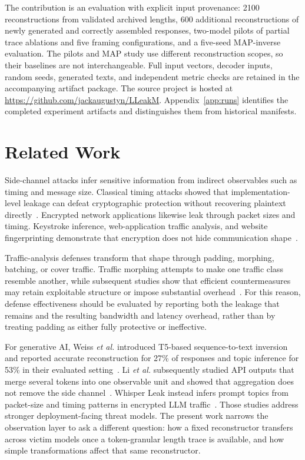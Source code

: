 \documentclass[electronics,article,submit,pdftex,moreauthors]{Definitions/mdpi}
\begin{document}
The contribution is an evaluation with explicit input provenance: 2100 reconstructions from validated archived lengths, 600 additional reconstructions of newly generated and correctly assembled responses, two-model pilots of partial trace ablations and five framing configurations, and a five-seed MAP-inverse evaluation. The pilots and MAP study use different reconstruction scopes, so their baselines are not interchangeable. Full input vectors, decoder inputs, random seeds, generated texts, and independent metric checks are retained in the accompanying artifact package. The source project is hosted at \url{https://github.com/jackaugustyn/LLeakM}. Appendix~\ref{app:runs} identifies the completed experiment artifacts and distinguishes them from historical manifests.

\section{Related Work}
Side-channel attacks infer sensitive information from indirect observables such as timing and message size. Classical timing attacks showed that implementation-level leakage can defeat cryptographic protection without recovering plaintext directly~\cite{kocher1996timing}. Encrypted network applications likewise leak through packet sizes and timing. Keystroke inference, web-application traffic analysis, and website fingerprinting demonstrate that encryption does not hide communication shape~\cite{song2001timing,chen2010sidechannel,cai2012touching,sirinam2018deep}.

Traffic-analysis defenses transform that shape through padding, morphing, batching, or cover traffic. Traffic morphing attempts to make one traffic class resemble another, while subsequent studies show that efficient countermeasures may retain exploitable structure or impose substantial overhead~\cite{wright2009morphing,dyer2012peekaboo}. For this reason, defense effectiveness should be evaluated by reporting both the leakage that remains and the resulting bandwidth and latency overhead, rather than by treating padding as either fully protective or ineffective.

For generative AI, Weiss \emph{et al.} introduced T5-based sequence-to-text inversion and reported accurate reconstruction for 27\% of responses and topic inference for 53\% in their evaluated setting~\cite{weiss2024prompt}. Li \emph{et al.} subsequently studied API outputs that merge several tokens into one observable unit and showed that aggregation does not remove the side channel~\cite{li2026length}. Whisper Leak instead infers prompt topics from packet-size and timing patterns in encrypted LLM traffic~\cite{whisperleak2025}. Those studies address stronger deployment-facing threat models. The present work narrows the observation layer to ask a different question: how a fixed reconstructor transfers across victim models once a token-granular length trace is available, and how simple transformations affect that same reconstructor.
\end{document}
